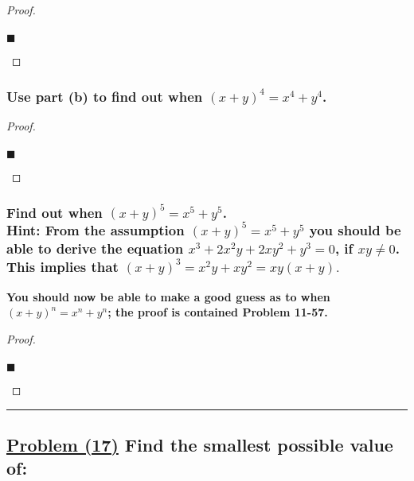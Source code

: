 \documentclass[letterpaper, 10 pt, conference]{ieeeconf}  %
\begin{document}
\begin{proof}
\begin{align}
    
\end{align}
\begin{flushright}
$\blacksquare$
\end{flushright}
\end{proof}

\subsubsection{\textbf{Use part (b) to find out when $(x + y)^4 = x^4 + y^4$.}}

\begin{proof}
\begin{align}
    
\end{align}
\begin{flushright}
$\blacksquare$
\end{flushright}
\end{proof}

\subsubsection{\textbf{Find out when $(x + y)^5 = x^5 + y^5$. \\ Hint: From the assumption $(x + y)^5 = x^5 + y^5$ you should be able to derive the equation $x^3 + 2x^2y + 2xy^2 + y^3 = 0$, if $xy \neq 0$. This implies that $(x + y)^3 = x^2y + xy^2 = xy(x + y).$}}

\textbf{You should now be able to make a good guess as to when $(x + y)^n = x^n + y^n$; the proof is contained Problem 11-57.}

\begin{proof}
\begin{align}
    
\end{align}
\begin{flushright}
$\blacksquare$
\end{flushright}
\end{proof}

\noindent\rule{8cm}{0.4pt}
\subsection{\textbf{\underline{Problem (17)} Find the smallest possible value of:}}
\end{document}
